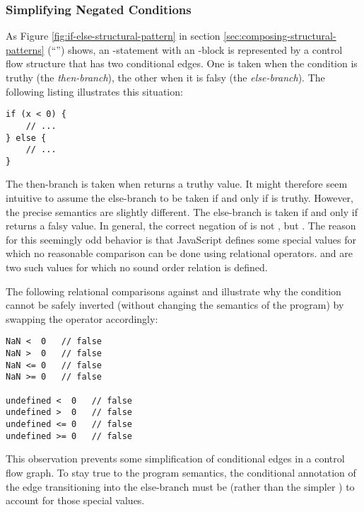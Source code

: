 \subsubsection{Simplifying Negated Conditions}

As Figure \ref{fig:if-else-structural-pattern} in section \ref{sec:composing-structural-patterns} (``'') shows, an -statement with an -block is represented by a control flow structure that has two conditional edges. One is taken when the condition is truthy (the \emph{then-branch}), the other when it is falsy (the \emph{else-branch}). The following listing illustrates this situation:

\begin{verbatim}
if (x < 0) {
    // ...
} else {
    // ...
}
\end{verbatim}

The then-branch is taken when  returns a truthy value. It might therefore seem intuitive to assume the else-branch to be taken if and only if  is truthy. However, the precise semantics are slightly different. The else-branch is taken if and only if  returns a falsy value. In general, the correct negation of  is not , but . The reason for this seemingly odd behavior is that JavaScript defines some special values for which no reasonable comparison can be done using relational operators.  and  are two such values for which no sound order relation is defined.

\newpage

The following relational comparisons against  and  illustrate why the condition cannot be safely inverted (without changing the semantics of the program) by swapping the operator accordingly:

\begin{verbatim}
NaN <  0   // false
NaN >  0   // false
NaN <= 0   // false
NaN >= 0   // false

undefined <  0   // false
undefined >  0   // false
undefined <= 0   // false
undefined >= 0   // false
\end{verbatim}

This observation prevents some simplification of conditional edges in a control flow graph. To stay true to the program semantics, the conditional annotation of the edge transitioning into the else-branch must be  (rather than the simpler ) to account for those special values.

